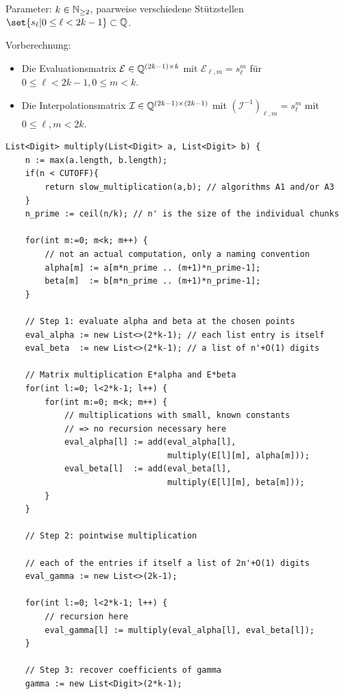 \begin{algorithm}
    \label{ag:toom_cook}
    Parameter: $k\in\mathbb{N}_{\geq{2}}$, paarweise verschiedene Stützstellen $\set{s_\ell | 0\leq\ell<2k-1}\subset\IQ$.

    Vorberechnung:
    \begin{itemize}
        \item Die Evaluationsmatrix $\mathcal{E}\in\mathbb{Q}^{(2k-1)\times k}$ mit $\mathcal{E}_{\ell,m} = s_\ell^m$ für $0\leq\ell<2k-1, 0\leq m<k$.
        \item Die Interpolationsmatrix $\mathcal{I}\in\mathbb{Q}^{(2k-1)\times(2k-1)}$ mit $(\mathcal{I}^{-1})_{\ell,m} = s_\ell^m$ mit $0\leq\ell,m < 2k$.
    \end{itemize}

    \begin{lstlisting}
List<Digit> multiply(List<Digit> a, List<Digit> b) {
    n := max(a.length, b.length);
    if(n < CUTOFF){
        return slow_multiplication(a,b); // algorithms A1 and/or A3
    }
    n_prime := ceil(n/k); // n' is the size of the individual chunks

    for(int m:=0; m<k; m++) {
        // not an actual computation, only a naming convention
        alpha[m] := a[m*n_prime .. (m+1)*n_prime-1];
        beta[m]  := b[m*n_prime .. (m+1)*n_prime-1];
    }

    // Step 1: evaluate alpha and beta at the chosen points
    eval_alpha := new List<>(2*k-1); // each list entry is itself
    eval_beta  := new List<>(2*k-1); // a list of n'+O(1) digits

    // Matrix multiplication E*alpha and E*beta
    for(int l:=0; l<2*k-1; l++) {
        for(int m:=0; m<k; m++) {
            // multiplications with small, known constants
            // => no recursion necessary here
            eval_alpha[l] := add(eval_alpha[l],
                                 multiply(E[l][m], alpha[m]));
            eval_beta[l]  := add(eval_beta[l],
                                 multiply(E[l][m], beta[m]));
        }
    }

    // Step 2: pointwise multiplication

    // each of the entries if itself a list of 2n'+O(1) digits
    eval_gamma := new List<>(2k-1);

    for(int l:=0; l<2*k-1; l++) {
        // recursion here
        eval_gamma[l] := multiply(eval_alpha[l], eval_beta[l]);
    }

    // Step 3: recover coefficients of gamma
    gamma := new List<Digit>(2*k-1);


\end{lstlisting}
\end{algorithm}
